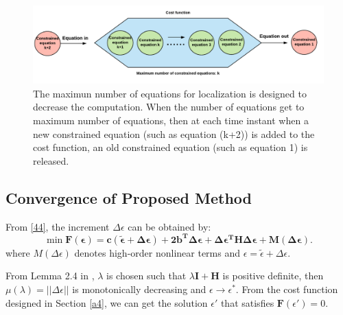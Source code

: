 \documentclass[journal]{IEEEtran}
\begin{document}
\begin{figure}[!t]
	\centering
	\includegraphics[width=0.8\linewidth]{pic/constrained.pdf}
	\caption{The maximun number of equations for localization is designed to decrease the computation. When the number of equations get to maximum number of equations, then at each time instant when a new constrained equation (such as equation (k+2)) is added to the cost function, an old constrained equation (such as equation 1) is released.}
	\label{fig4}
\end{figure}

\subsection{Convergence of Proposed Method}

From \eqref{44}, the increment $\Delta \epsilon$ can be obtained by: 
\begin{equation}\label{b1}
\min  \mathbf{F(\epsilon)} = \mathbf { c(\widetilde \epsilon + \Delta \epsilon) + 2b^{T}\Delta \epsilon + \Delta \epsilon^{T}H\Delta \epsilon + M(\Delta \epsilon)}.
\end{equation}
where $M(\Delta \epsilon)$ denotes high-order nonlinear terms and $\epsilon = \widetilde \epsilon + \Delta \epsilon$. 

From Lemma 2.4 in \cite{Luo:2007cz}, $\lambda$ is chosen such that $\lambda \mathbf{I + H}$ is positive definite, then $\mu(\lambda) = ||\Delta \epsilon||$ is monotonically decreasing and $\epsilon \rightarrow \epsilon^{\ast}$. From the cost function designed in Section \ref{a4}, we can get the solution $\epsilon'$ that satisfies $\mathbf F(\epsilon') = 0$.
\end{document}
